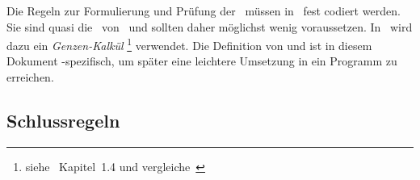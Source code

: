 Die Regeln zur Formulierung und Prüfung der \Beweise\ müssen in \ASBA\ fest codiert werden.
Sie sind quasi die \Axiome\ von \ASBA\ und sollten daher möglichst wenig voraussetzen.
In \ASBA\ wird dazu ein \emph{Genzen-Kalkül}%
\footnote{%
	siehe~\cite{bib:Rautenberg} Kapitel~1.4 und vergleiche~\cite{bib:Schlussregel,bib:NatuerlichesSchliessen}
} verwendet.
Die Definition von \emph{} und \emph{\Beweise} ist in diesem Dokument \ASBA-spezifisch, um später eine leichtere Umsetzung in ein Programm zu erreichen.

\subsection{Schlussregeln}%
\label{sub:Schlussregeln}

